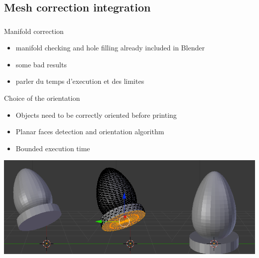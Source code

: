 \documentclass{beamer}
\begin{document}
\subsection{Mesh correction integration}
\begin{frame}
	\frametitle{}

    \begin{block}{Manifold correction}
		\begin{itemize}
			\item manifold checking and hole filling already included in Blender
			\item some bad results
			\item parler du temps d'execution et des limites
		\end{itemize}
    \end{block}
\end{frame}
\begin{frame}
	\begin{block}{Choice of the orientation}
		\begin{itemize}
			\item Objects need to be correctly oriented before printing
			\item Planar faces detection and orientation algorithm
			\item Bounded execution time
		\end{itemize}
    \end{block}

	\begin{center}
		\includegraphics[width=\textwidth]{pf_detect}
	\end{center}
\end{frame}
\end{document}
